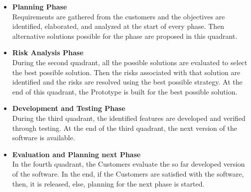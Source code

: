 \vspace{1cm}
\begin{itemize}
    \item \textbf{Planning Phase}\\
Requirements are gathered from the customers and the objectives are
identified, elaborated, and analyzed at the start of every phase. Then
alternative solutions possible for the phase are proposed in this quadrant.
     \item \textbf{Risk Analysis Phase}\\
     During the second quadrant, all the possible solutions are evaluated to
select the best possible solution. Then the risks associated with that
solution are identified and the risks are resolved using the best possible
strategy. At the end of this quadrant, the Prototype is built for the best
possible solution.
     
      \item \textbf{Development and Testing Phase}\\
      During the third quadrant, the identified features are developed and
verified through testing. At the end of the third quadrant, the next version
of the software is available.
       \item \textbf{Evaluation and Planning next Phase}\\
       In the fourth quadrant, the Customers evaluate the so far developed version
of the software. In the end, if the Customers are satisfied with the software,
then, it is released, else, planning for the next phase is started.
       
\end{itemize}
